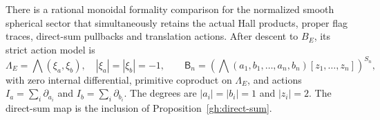 \begin{theorem}
\label{gh:simultaneous}
There is a rational monoidal formality comparison for the normalized
smooth spherical sector that simultaneously retains the actual Hall
products, proper flag traces, direct-sum pullbacks and translation
actions. After descent to $B_E$, its strict action model is
\[
 \Lambda_E=\bigwedge(\xi_a,\xi_b),\quad |\xi_a|=|\xi_b|=-1,
 \qquad
 \mathsf B_n=
 \left(\bigwedge(a_1,b_1,\ldots,a_n,b_n)
                   [z_1,\ldots,z_n]\right)^{S_n},
\]
with zero internal differential, primitive coproduct on
$\Lambda_E$, and actions
$I_a=\sum_i\partial_{a_i}$ and $I_b=\sum_i\partial_{b_i}$.
The degrees are $|a_i|=|b_i|=1$ and $|z_i|=2$.
The direct-sum map is the inclusion of Proposition~\ref{gh:direct-sum}.
\end{theorem}
